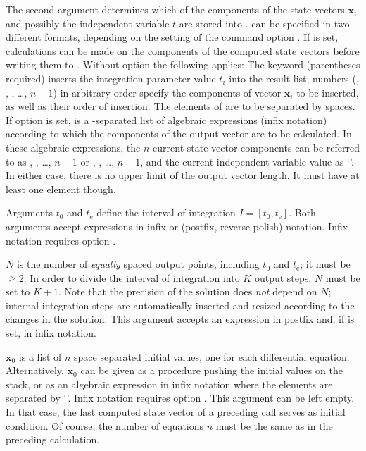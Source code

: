 \documentclass[
  fontsize=11pt,
  english,
  BCOR=10mm,DIV=12,
  bibliography=totoc,
  parskip=false,
  headings=small,
  headinclude=false,
  footinclude=false,
  twoside=false,
  UKenglish
]{pst-doc}
\begin{document}
The second argument  determines which of the components of the state vectors $\mathbf{x}_i$ and possibly the independent variable $t$ are stored into .  can be specified in two different formats, depending on the setting of the command option .
If  is set, calculations can be made on the components of the computed state vectors before writing them to . Without option  the following applies: The keyword  (parentheses required) inserts the integration parameter value $t_i$ into the result list; numbers (, , , \dots, $n-1$) in arbitrary order specify the components of vector $\mathbf{x}_i$ to be inserted, as well as their order of insertion. The elements of  are to be separated by spaces. If option  is set,  is a \Lkeyword{|}-separated list of algebraic expressions (infix notation) according to which the components of the output vector are to be calculated. In these algebraic expressions, the $n$ current state vector components can be referred to as , , \dots, \Lkeyword{x[}$n-1$\Lkeyword{]} or , , \dots, \Lkeyword{y[}$n-1$\Lkeyword{]}, and the current independent variable value as `'. In either case, there is no upper limit of the output vector length. It must have at least one element though.

Arguments $t_0$ and $t_\mathrm{e}$ define the interval of integration $I=[t_0, t_\mathrm{e}]$. Both arguments accept expressions in infix or \PS{} (postfix, reverse polish) notation. Infix notation requires option .

$N$ is the number of \emph{equally} spaced output points, including $t_0$ and $t_\mathrm{e}$; it must be $\ge 2$. In order to divide the interval of integration into $K$ output steps, $N$ must be set to $K+1$. Note that the precision of the solution does \emph{not} depend on $N$; internal integration steps are automatically inserted and resized according to the changes in the solution. This argument accepts an expression in postfix and, if  is set, in infix notation.

$\mathbf{x}_0$ is a list of $n$ space separated initial values, one for each differential equation. Alternatively, $\mathbf{x}_0$ can be given as a \PS{} procedure pushing the initial values on the stack, or as an algebraic expression in infix notation where the elements are separated by `\Lkeyword{|}'. Infix notation requires option . This argument can be left empty. In that case, the last computed state vector of a preceding  call serves as initial condition. Of course, the number of equations $n$ must be the same as in the preceding calculation.
\end{document}
